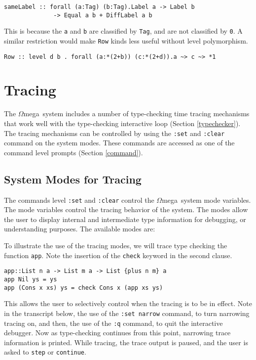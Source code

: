 \documentclass[11pt,twoside]{article}
\newcommand{\om}{$\Omega$mega}
\begin{document}
\begin{verbatim}
sameLabel :: forall (a:Tag) (b:Tag).Label a -> Label b
              -> Equal a b + DiffLabel a b
\end{verbatim}
\noindent
This is because the {\tt a} and {\tt b} are classified by {\tt Tag}, and are not classified by {\tt *0}. A similar restriction would make
{\tt Row} kinds less useful without level polymorphism.


\begin{verbatim}
Row :: level d b . forall (a:*(2+b)) (c:*(2+d)).a ~> c ~> *1
\end{verbatim} 


\section{Tracing}\label{tracing}

The \om\ system includes a number of type-checking time tracing mechanisms that work
well with the type-checking interactive loop (Section \ref{typechecker}). The tracing 
mechanisms can be controlled by using the {\tt :set} and {\tt :clear} command
on the system modes. These commands are accessed as one of the
command level prompts (Section \ref{command}).

\subsection{System Modes for Tracing}
The commands level {\tt :set} and {\tt :clear} control the
\om\ system mode variables.
The mode variables control the tracing behavior of the system. The modes
allow the user to display internal and intermediate type
information for debugging, or understanding purposes.
The available modes are:



To illustrate the use of the tracing modes, we will trace type checking the function
{\tt app}. Note the insertion of the {\tt check} keyword
in the second clause.

\begin{verbatim}
app::List n a -> List m a -> List {plus n m} a   
app Nil ys = ys
app (Cons x xs) ys = check Cons x (app xs ys)
\end{verbatim}

This allows the user to selectively control when the tracing is to be in effect.
Note in the transcript below, the use of the {\tt :set narrow} command, to turn
narrowing tracing on, and then, the use of the {\tt :q} command, to quit the
interactive debugger. Now as type-checking continues from this point, narrowing
trace information is printed. While tracing, the trace output is paused, and the
user is asked to {\tt step} or {\tt continue}.
\end{document}
